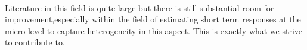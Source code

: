 \label{sec:conclusion}


\medskip \\
Literature in this field is quite large but there is still substantial room for improvement,especially within the field of estimating short term responses at the micro-level to capture heterogeneity in this aspect. This is exactly what we strive to contribute to.